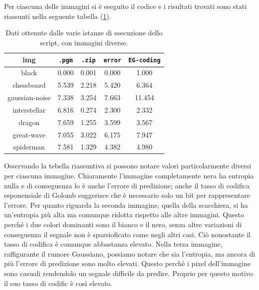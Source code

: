 \noindent Per ciascuna delle immagini si è eseguito il codice e i risultati trovati sono stati riassunti nella seguente tabella (\ref{tab:simple-conclusions}).


\begin{table}[h]
    \centering
    \renewcommand{\arraystretch}{1.5}
    \begin{tabular}{| c | c c c c |}
        \hline
        \textbf{img} & \texttt{.pgm} & \texttt{.zip} & \texttt{error} & \texttt{EG-coding} \\ \hline \hline

        black & 0.000 & 0.001 & 0.000 & 1.000 \\
        
        chessboard & 5.539 & 2.218 & 5.420 & 6.364 \\
        
        gaussian-noise & 7.338 & 3.254 & 7.663 & 11.454 \\
        
        interstellar & 6.816 & 0.274 & 2.300 & 2.332 \\
        
        dragon & 7.659 & 1.255 & 3.599 & 3.567 \\
        
        great-wave & 7.055 & 3.022 & 6.175 & 7.947 \\
        
        spiderman & 7.581 & 1.329 & 4.382 & 4.980 \\
        \hline
    \end{tabular}
    \caption{Dati ottenute dalle varie istanze di esecuzione dello script, con immagini diverse.}
    \label{tab:simple-conclusions}
    \renewcommand{\arraystretch}{1}
\end{table}

\noindent Osservando la tebella riassuntiva si possono notare valori particolarmente diversi per ciascuna immagine. Chiaramente l'immagine completamente nera ha entropia nulla e di conseguenza lo è anche l'errore di predizione; anche il tasso di codifica esponensiale di Golomb suggerisce che è  necessario solo un bit per rappresentare l'errore. Per quanto riguarda la seconda immagine, quella della scacchiera, si ha un'entropia più alta ma comunque ridotta rispetto alle altre immagini. Questo perché i due colori dominanti sono il bianco e il nero, senza altre variazioni di conseguenza il segnale non è sparsioficato come negli altri casi. Ciò nonostante il tasso di codifica è comunque abbastanza elevato. Nella terza immagine, raffigurante il rumore Gaussiano, possiamo notare che sia l'entropia, ma ancora di più l'errore di predizione sono molto elevati. Questo perchè i pixel dell'immagine sono casuali rendendolo un segnale difficile da predire. Proprio per questo motivo il suo tasso di codific è così elevato.

